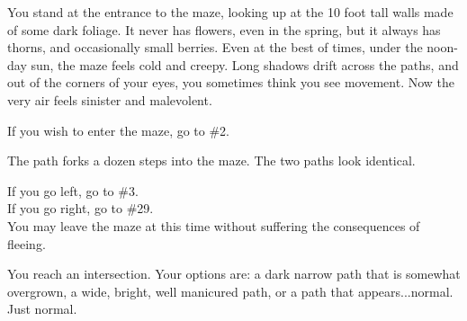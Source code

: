 \documentclass[green]{gl2018}
\begin{document}
\begin{LARGE}
\begin{location}{1}
You stand at the entrance to the maze, looking up at the 10 foot tall walls made of some dark foliage. It never has flowers, even in the spring, but it always has thorns, and occasionally small berries. Even at the best of times, under the noon-day sun, the maze feels cold and creepy. Long shadows drift across the paths, and out of the corners of your eyes, you sometimes think you see movement. Now the very air feels sinister and malevolent. 

\begin{fromhere}If you wish to enter the maze, go to \#2.\end{fromhere}
\end{location}
\begin{location}{2}
The path forks a dozen steps into the maze. The two paths look identical.  
\begin{fromhere}
If you go left, go to \#3. \\
If you go right, go to \#29.\\
You may leave the maze at this time without suffering the consequences of fleeing.
\end{fromhere}
\end{location}
\begin{location}{3}
You reach an intersection. Your options are: a dark narrow path that is somewhat overgrown, a wide, bright, well manicured path, or a path that appears...normal.  Just normal.


\end{location}
\end{LARGE}
\end{document}
